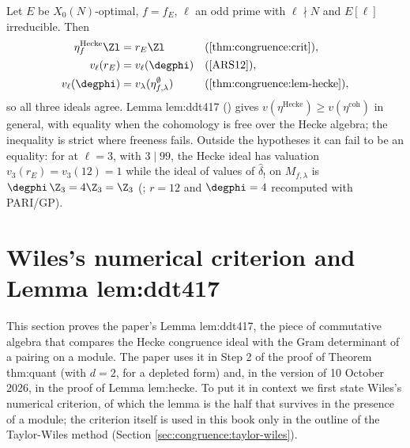 \begin{remark}\label{rem:congruence:two-ideals}
Let $E$ be $X_0(N)$-optimal, $f=f_E$, $\ell$ an odd prime with $\ell\nmid N$ and $E[\ell]$ irreducible. Then
\begin{align*}
\eta^{\mathrm{Hecke}}_f\Zl&=r_E\Zl&&(\text{\Cref{thm:congruence:crit}}),\\
v_\ell(r_E)&=v_\ell(\degphi)&&(\text{\cite[Theorem 2.2]{ARS12}}),\\
v_\ell(\degphi)&=v_\lambda(\eta^\emptyset_{f,\lambda})&&(\text{\Cref{thm:congruence:lem-hecke}}),
\end{align*}
so all three ideals agree. Lemma lem:ddt417 () gives $v(\eta^{\mathrm{Hecke}})\ge v(\eta^{\mathrm{coh}})$ in general, with equality when the cohomology is free over the
Hecke algebra; the inequality is strict where freeness fails. Outside the hypotheses it can fail to be an equality: for  at $\ell=3$, with $3\mid99$, the
Hecke ideal has valuation $v_3(r_E)=v_3(12)=1$ while the ideal of values of $\hat\delta_!$ on $M_{f,\lambda}$ is $\degphi\,\Z_3=4\Z_3=\Z_3$ (; $r=12$ and $\degphi=4$
recomputed with PARI/GP).
\end{remark}

\section{Wiles's numerical criterion and Lemma lem:ddt417}\label{sec:congruence:ddt417}

This section proves the paper's Lemma lem:ddt417, the piece of commutative algebra that compares the Hecke congruence ideal with the Gram determinant
of a pairing on a module. The paper uses it in Step 2 of the proof of Theorem thm:quant (with $d=2$, for a depleted form) and, in the version of 10 October
2026, in the proof of Lemma lem:hecke. To put it in context we first state Wiles's numerical criterion, of which the lemma is the half that survives in the
presence of a module; the criterion itself is used in this book only in the outline of the Taylor-Wiles method (Section \ref{sec:congruence:taylor-wiles}).

